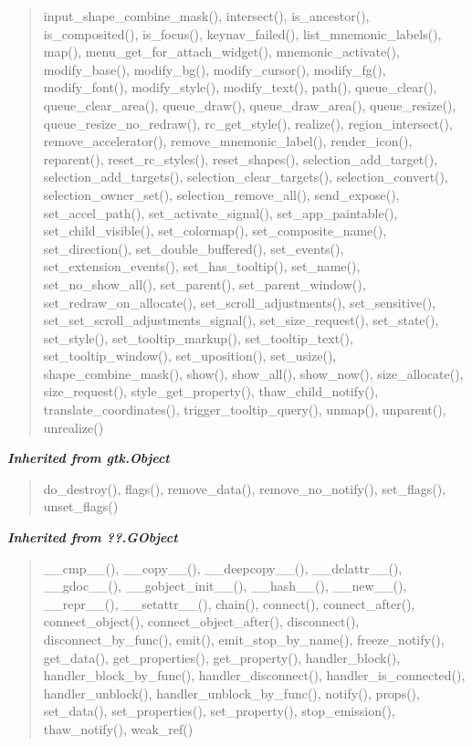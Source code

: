 \begin{quote}
input\_shape\_combine\_mask(), intersect(), is\_ancestor(), is\_composited(), is\_focus(), keynav\_failed(), list\_mnemonic\_labels(), map(), menu\_get\_for\_attach\_widget(), mnemonic\_activate(), modify\_base(), modify\_bg(), modify\_cursor(), modify\_fg(), modify\_font(), modify\_style(), modify\_text(), path(), queue\_clear(), queue\_clear\_area(), queue\_draw(), queue\_draw\_area(), queue\_resize(), queue\_resize\_no\_redraw(), rc\_get\_style(), realize(), region\_intersect(), remove\_accelerator(), remove\_mnemonic\_label(), render\_icon(), reparent(), reset\_rc\_styles(), reset\_shapes(), selection\_add\_target(), selection\_add\_targets(), selection\_clear\_targets(), selection\_convert(), selection\_owner\_set(), selection\_remove\_all(), send\_expose(), set\_accel\_path(), set\_activate\_signal(), set\_app\_paintable(), set\_child\_visible(), set\_colormap(), set\_composite\_name(), set\_direction(), set\_double\_buffered(), set\_events(), set\_extension\_events(), set\_has\_tooltip(), set\_name(), set\_no\_show\_all(), set\_parent(), set\_parent\_window(), set\_redraw\_on\_allocate(), set\_scroll\_adjustments(), set\_sensitive(), set\_set\_scroll\_adjustments\_signal(), set\_size\_request(), set\_state(), set\_style(), set\_tooltip\_markup(), set\_tooltip\_text(), set\_tooltip\_window(), set\_uposition(), set\_usize(), shape\_combine\_mask(), show(), show\_all(), show\_now(), size\_allocate(), size\_request(), style\_get\_property(), thaw\_child\_notify(), translate\_coordinates(), trigger\_tooltip\_query(), unmap(), unparent(), unrealize()
\end{quote}

\large{\textbf{\textit{Inherited from gtk.Object}}}

\begin{quote}
do\_destroy(), flags(), remove\_data(), remove\_no\_notify(), set\_flags(), unset\_flags()
\end{quote}

\large{\textbf{\textit{Inherited from ??.GObject}}}

\begin{quote}
\_\_cmp\_\_(), \_\_copy\_\_(), \_\_deepcopy\_\_(), \_\_delattr\_\_(), \_\_gdoc\_\_(), \_\_gobject\_init\_\_(), \_\_hash\_\_(), \_\_new\_\_(), \_\_repr\_\_(), \_\_setattr\_\_(), chain(), connect(), connect\_after(), connect\_object(), connect\_object\_after(), disconnect(), disconnect\_by\_func(), emit(), emit\_stop\_by\_name(), freeze\_notify(), get\_data(), get\_properties(), get\_property(), handler\_block(), handler\_block\_by\_func(), handler\_disconnect(), handler\_is\_connected(), handler\_unblock(), handler\_unblock\_by\_func(), notify(), props(), set\_data(), set\_properties(), set\_property(), stop\_emission(), thaw\_notify(), weak\_ref()
\end{quote}


